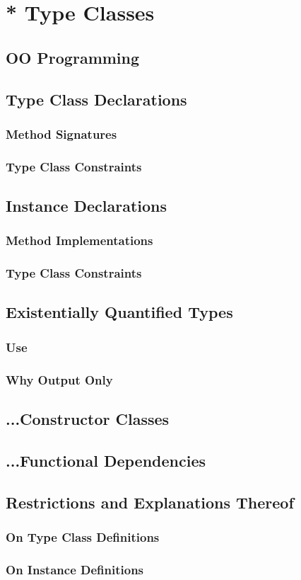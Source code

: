 \section{* Type Classes}
\subsection{OO Programming}
\subsection{Type Class Declarations}
\subsubsection{Method Signatures}
\subsubsection{Type Class Constraints}
\subsection{Instance Declarations}
\subsubsection{Method Implementations}
\subsubsection{Type Class Constraints}
\subsection{Existentially Quantified Types}
\subsubsection{Use}
\subsubsection{Why Output Only}
\subsection{...Constructor Classes}
\subsection{...Functional Dependencies}
\subsection{Restrictions and Explanations Thereof}
\subsubsection{On Type Class Definitions}
\subsubsection{On Instance Definitions}



